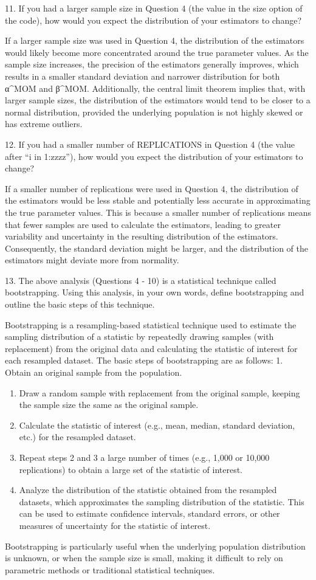 \documentclass[
]{article}
\begin{document}
{ 11. If you had a larger sample size in Question 4 (the value in the
size option of the code), how would you expect the distribution of your
estimators to change? }

If a larger sample size was used in Question 4, the distribution of the
estimators would likely become more concentrated around the true
parameter values. As the sample size increases, the precision of the
estimators generally improves, which results in a smaller standard
deviation and narrower distribution for both α\^{}MOM and β\^{}MOM.
Additionally, the central limit theorem implies that, with larger sample
sizes, the distribution of the estimators would tend to be closer to a
normal distribution, provided the underlying population is not highly
skewed or has extreme outliers.

{ 12. If you had a smaller number of REPLICATIONS in Question 4 (the
value after ``i in 1:zzzz''), how would you expect the distribution of
your estimators to change? }

If a smaller number of replications were used in Question 4, the
distribution of the estimators would be less stable and potentially less
accurate in approximating the true parameter values. This is because a
smaller number of replications means that fewer samples are used to
calculate the estimators, leading to greater variability and uncertainty
in the resulting distribution of the estimators. Consequently, the
standard deviation might be larger, and the distribution of the
estimators might deviate more from normality.

{ 13. The above analysis (Questions 4 - 10) is a statistical technique
called bootstrapping. Using this analysis, in your own words, define
bootstrapping and outline the basic steps of this technique. }

Bootstrapping is a resampling-based statistical technique used to
estimate the sampling distribution of a statistic by repeatedly drawing
samples (with replacement) from the original data and calculating the
statistic of interest for each resampled dataset. The basic steps of
bootstrapping are as follows: 1. Obtain an original sample from the
population.

\begin{enumerate}
\def\labelenumi{\arabic{enumi}.}
\setcounter{enumi}{1}
\item
  Draw a random sample with replacement from the original sample,
  keeping the sample size the same as the original sample.
\item
  Calculate the statistic of interest (e.g., mean, median, standard
  deviation, etc.) for the resampled dataset.
\item
  Repeat steps 2 and 3 a large number of times (e.g., 1,000 or 10,000
  replications) to obtain a large set of the statistic of interest.
\item
  Analyze the distribution of the statistic obtained from the resampled
  datasets, which approximates the sampling distribution of the
  statistic. This can be used to estimate confidence intervals, standard
  errors, or other measures of uncertainty for the statistic of
  interest.
\end{enumerate}

Bootstrapping is particularly useful when the underlying population
distribution is unknown, or when the sample size is small, making it
difficult to rely on parametric methods or traditional statistical
techniques.
\end{document}
